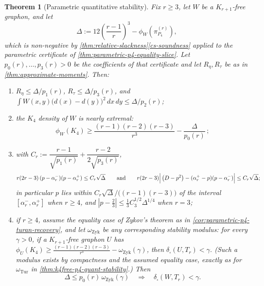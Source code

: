 \documentclass[11pt]{article}
\newtheorem{theorem}{Theorem}
\theoremstyle{definition}
\begin{document}
\begin{theorem}[Parametric quantitative stability]\label{thm:parametric-quant-stability}
Fix $r\ge3$, let $W$ be a $K_{r+1}$-free graphon, and let
\[
  \Delta:=12\left(\frac{r-1}{r}\right)^3-\phi_W(\pi_{P_4}^{(r)}),
\]
which is non-negative by \cref{thm:relative-slackness}\ref{cs-soundness} applied to the
parametric certificate of \cref{thm:parametric-p4-equality-slice}.  Let
$p_0(r),\dots,p_3(r)>0$ be the coefficients of that certificate and let
$R_\eta,R_\tau$ be as in \cref{thm:approximate-moments}.  Then:
\begin{enumerate}[label=\textup{(\roman*)}, leftmargin=2.5em]
  \item\label{pq:squares} $R_\eta\le\Delta/p_1(r)$, $R_\tau\le\Delta/p_3(r)$, and
  $\displaystyle\int W(x,y)\bigl(d(x)-d(y)\bigr)^2\,dx\,dy\le\Delta/p_2(r)$;
  \item\label{pq:k4} the $K_4$ density of $W$ is nearly extremal:
  \[
    \phi_W(K_4)\ge\frac{(r-1)(r-2)(r-3)}{r^3}-\frac{\Delta}{p_0(r)}\,;
  \]
  \item\label{pq:quadratic} with
  $C_r:=\dfrac{r-1}{\sqrt{p_1(r)}}+\dfrac{r-2}{2\sqrt{p_3(r)}}$,
  \[
    r(2r-3)\,(p-\alpha_r^-)(p-\alpha_r^+)
    \le
    C_r\sqrt\Delta
    \qquad\text{and}\qquad
    r(2r-3)\Bigl|\,\bigl(D-p^2\bigr)-(\alpha_r^+-p)(p-\alpha_r^-)\Bigr|
    \le
    C_r\sqrt\Delta ;
  \]
  in particular $p$ lies within $C_r\sqrt\Delta/\bigl((r-1)(r-3)\bigr)$ of the interval
  $[\alpha_r^-,\alpha_r^+]$ when $r\ge4$, and
  $|p-\tfrac23|\le\tfrac13C_3^{1/2}\Delta^{1/4}$ when $r=3$;
  \item\label{pq:zykov} if $r\ge4$, assume the equality case of Zykov's theorem as in
  \cref{cor:parametric-p4-turan-recovery}, and let $\omega_{\mathrm{Zyk}}$ be any
  corresponding stability modulus: for every $\gamma>0$, if a $K_{r+1}$-free graphon $U$
  has $\phi_U(K_4)\ge\frac{(r-1)(r-2)(r-3)}{r^3}-\omega_{\mathrm{Zyk}}(\gamma)$, then
  $\delta_\square(U,T_r)<\gamma$.  (Such a modulus exists by compactness and the assumed
  equality case, exactly as for $\omega_{\mathrm{Tur}}$ in
  \cref{thm:k4free-p4-quant-stability}.)  Then
  \[
    \Delta\le p_0(r)\,\omega_{\mathrm{Zyk}}(\gamma)
    \quad\Longrightarrow\quad
    \delta_\square(W,T_r)<\gamma .
  \]
\end{enumerate}
\end{theorem}
\end{document}
